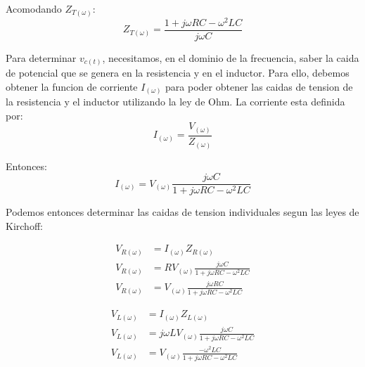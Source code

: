 \documentclass[a4paper,12pt]{report}
\begin{document}
\begin{enumerate}[label=\alph*), left=0pt]
                Acomodando $Z_{T(\omega)}$:
                \begin{equation*}
                    Z_{T(\omega)} = \frac{1 + j \omega R C - \omega^2 L C}{j \omega C}
                \end{equation*}

                Para determinar $v_{c(t)}$, necesitamos, en el dominio de la frecuencia, saber la caida de potencial
                que se genera en la resistencia y en el inductor. Para ello, debemos obtener la funcion de corriente
                $I_{(\omega)}$ para poder obtener las caidas de tension de la resistencia y el inductor utilizando la
                ley de Ohm. La corriente esta definida por:
                \begin{equation}
                    \label{corriente}
                    I_{(\omega)} = \frac{V_{(\omega)}}{Z_{(\omega)}}
                \end{equation}

                Entonces:
                \begin{equation*}
                    I_{(\omega)} = V_{(\omega)} \frac{j \omega C}{1 + j \omega R C - \omega^2 L C}
                \end{equation*}

                Podemos entonces determinar las caidas de tension individuales segun las leyes de Kirchoff:
                \begin{figure}[h]
                    \centering
                    \begin{minipage}{0.4\textwidth}
                        \begin{align*}
                            V_{R(\omega)} &= I_{(\omega)} Z_{R(\omega)}\\
                            V_{R(\omega)} &= R V_{(\omega)} \frac{j \omega C}{1 + j \omega R C - \omega^2 L C}\\
                            V_{R(\omega)} &= V_{(\omega)} \frac{j \omega R C}{1 + j \omega R C - \omega^2 L C}
                        \end{align*}
                    \end{minipage}
                    \hspace{1cm}
                    \begin{minipage}{0.4\textwidth}
                        \begin{align*}
                            V_{L(\omega)} &= I_{(\omega)} Z_{L(\omega)}\\
                            V_{L(\omega)} &= j \omega L V_{(\omega)} \frac{j \omega C}{1 + j \omega R C - \omega^2 L C}\\
                            V_{L(\omega)} &= V_{(\omega)} \frac{-\omega^2 L C}{1 + j \omega R C - \omega^2 L C}
                        \end{align*}
                    \end{minipage}
                \end{figure}


\end{enumerate}
\end{document}
